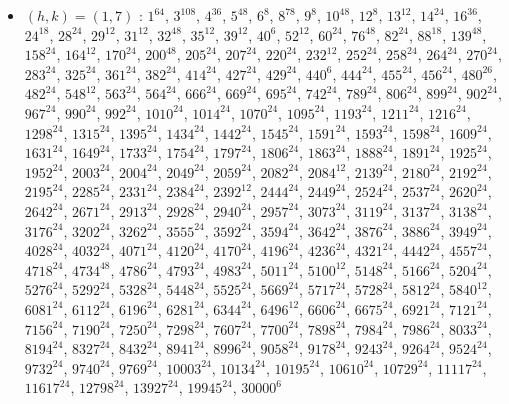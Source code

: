 \begin{itemize}
\item $(h,k)=(1,7)$ : $1^{64}$, $3^{108}$, $4^{36}$, $5^{48}$, $6^{8}$, $8^{78}$, $9^{8}$, $10^{48}$, $12^{8}$, $13^{12}$, $14^{24}$, $16^{36}$, $24^{18}$, $28^{24}$, $29^{12}$, $31^{12}$, $32^{48}$, $35^{12}$, $39^{12}$, $40^{6}$, $52^{12}$, $60^{24}$, $76^{48}$, $82^{24}$, $88^{18}$, $139^{48}$, $158^{24}$, $164^{12}$, $170^{24}$, $200^{48}$, $205^{24}$, $207^{24}$, $220^{24}$, $232^{12}$, $252^{24}$, $258^{24}$, $264^{24}$, $270^{24}$, $283^{24}$, $325^{24}$, $361^{24}$, $382^{24}$, $414^{24}$, $427^{24}$, $429^{24}$, $440^{6}$, $444^{24}$, $455^{24}$, $456^{24}$, $480^{26}$, $482^{24}$, $548^{12}$, $563^{24}$, $564^{24}$, $666^{24}$, $669^{24}$, $695^{24}$, $742^{24}$, $789^{24}$, $806^{24}$, $899^{24}$, $902^{24}$, $967^{24}$, $990^{24}$, $992^{24}$, $1010^{24}$, $1014^{24}$, $1070^{24}$, $1095^{24}$, $1193^{24}$, $1211^{24}$, $1216^{24}$, $1298^{24}$, $1315^{24}$, $1395^{24}$, $1434^{24}$, $1442^{24}$, $1545^{24}$, $1591^{24}$, $1593^{24}$, $1598^{24}$, $1609^{24}$, $1631^{24}$, $1649^{24}$, $1733^{24}$, $1754^{24}$, $1797^{24}$, $1806^{24}$, $1863^{24}$, $1888^{24}$, $1891^{24}$, $1925^{24}$, $1952^{24}$, $2003^{24}$, $2004^{24}$, $2049^{24}$, $2059^{24}$, $2082^{24}$, $2084^{12}$, $2139^{24}$, $2180^{24}$, $2192^{24}$, $2195^{24}$, $2285^{24}$, $2331^{24}$, $2384^{24}$, $2392^{12}$, $2444^{24}$, $2449^{24}$, $2524^{24}$, $2537^{24}$, $2620^{24}$, $2642^{24}$, $2671^{24}$, $2913^{24}$, $2928^{24}$, $2940^{24}$, $2957^{24}$, $3073^{24}$, $3119^{24}$, $3137^{24}$, $3138^{24}$, $3176^{24}$, $3202^{24}$, $3262^{24}$, $3555^{24}$, $3592^{24}$, $3594^{24}$, $3642^{24}$, $3876^{24}$, $3886^{24}$, $3949^{24}$, $4028^{24}$, $4032^{24}$, $4071^{24}$, $4120^{24}$, $4170^{24}$, $4196^{24}$, $4236^{24}$, $4321^{24}$, $4442^{24}$, $4557^{24}$, $4718^{24}$, $4734^{48}$, $4786^{24}$, $4793^{24}$, $4983^{24}$, $5011^{24}$, $5100^{12}$, $5148^{24}$, $5166^{24}$, $5204^{24}$, $5276^{24}$, $5292^{24}$, $5328^{24}$, $5448^{24}$, $5525^{24}$, $5669^{24}$, $5717^{24}$, $5728^{24}$, $5812^{24}$, $5840^{12}$, $6081^{24}$, $6112^{24}$, $6196^{24}$, $6281^{24}$, $6344^{24}$, $6496^{12}$, $6606^{24}$, $6675^{24}$, $6921^{24}$, $7121^{24}$, $7156^{24}$, $7190^{24}$, $7250^{24}$, $7298^{24}$, $7607^{24}$, $7700^{24}$, $7898^{24}$, $7984^{24}$, $7986^{24}$, $8033^{24}$, $8194^{24}$, $8327^{24}$, $8432^{24}$, $8941^{24}$, $8996^{24}$, $9058^{24}$, $9178^{24}$, $9243^{24}$, $9264^{24}$, $9524^{24}$, $9732^{24}$, $9740^{24}$, $9769^{24}$, $10003^{24}$, $10134^{24}$, $10195^{24}$, $10610^{24}$, $10729^{24}$, $11117^{24}$, $11617^{24}$, $12798^{24}$, $13927^{24}$, $19945^{24}$, $30000^{6}$

\end{itemize}
